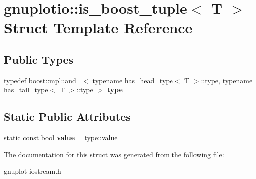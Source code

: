 \hypertarget{structgnuplotio_1_1is__boost__tuple}{}\section{gnuplotio\+:\+:is\+\_\+boost\+\_\+tuple$<$ T $>$ Struct Template Reference}
\label{structgnuplotio_1_1is__boost__tuple}
\subsection*{Public Types}
\begin{DoxyCompactItemize}
\item 
\mbox{\label{structgnuplotio_1_1is__boost__tuple_ad771f62833b23ecae5dc689e6248396a}} 
typedef boost\+::mpl\+::and\+\_\+$<$ typename has\+\_\+head\+\_\+type$<$ T $>$\+::type, typename has\+\_\+tail\+\_\+type$<$ T $>$\+::type $>$ {\bfseries type}
\end{DoxyCompactItemize}
\subsection*{Static Public Attributes}
\begin{DoxyCompactItemize}
\item 
\mbox{\label{structgnuplotio_1_1is__boost__tuple_ae6664b02421d28585204104af65a4744}} 
static const bool {\bfseries value} = type\+::value
\end{DoxyCompactItemize}


The documentation for this struct was generated from the following file\+:\begin{DoxyCompactItemize}
\item 
gnuplot-\/iostream.\+h\end{DoxyCompactItemize}
